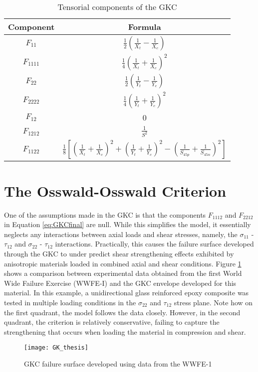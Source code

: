 \documentclass[main.tex]{subfiles}
\begin{document}
\begin{table} [h]
	\centering
	\caption{Tensorial components of the GKC}
	\begin{tabular}{ c c } 
	\toprule
		\textbf{Component} & \textbf{Formula} \\
		\midrule
		$F_{11}$ & $\frac{1}{2}(\frac{1}{X_t}-\frac{1}{X_c})$\\ [1ex]
		$F_{1111}$ & $\frac{1}{4}(\frac{1}{X_t}+\frac{1}{X_c})^2$\\ [1ex]
		$F_{22}$ & $\frac{1}{2}(\frac{1}{Y_t}-\frac{1}{Y_c})$\\ [1ex]
		$F_{2222}$ & $\frac{1}{4}(\frac{1}{Y_t}+\frac{1}{Y_c})^2$\\ [1ex]
		$F_{12}$ & 0\\ [1ex]
		$F_{1212}$ & $\frac{1}{S^2}$\\ [1ex]
		$F_{1122}$ & $\frac{1}{8}[(\frac{1}{X_t}+\frac{1}{X_c})^2+(\frac{1}{Y_t}+\frac{1}{Y_c})^2-(\frac{1}{S_{45p}}+\frac{1}{S_{45n}})^2]$\\ [1ex]
		\bottomrule
	\end{tabular}
	\label{tab:GKtens}
\end{table}
\pagebreak

\section{The Osswald-Osswald Criterion}\label{sec:OOC}
One of the assumptions made in the GKC is that the components $F_{1112}$ and $F_{2212}$ in Equation \ref{eq:GKCfinal} are null. While this simplifies the model, it essentially neglects any interactions between axial loads and shear stresses, namely, the $\sigma_{11}$ - $\tau_{12}$ and $\sigma_{22}$ - $\tau_{12}$ interactions. Practically, this causes the failure surface developed through the GKC to under predict shear strengthening effects exhibited by anisotropic materials loaded in combined axial and shear conditions. Figure \ref{fig:GKClimit} shows a comparison between experimental data obtained from the first World Wide Failure Exercise (WWFE-I) and the GKC envelope developed for this material. In this example, a unidirectional glass reinforced epoxy composite was tested in multiple loading conditions in the $\sigma_{22}$ and $\tau_{12}$ stress plane. Note how on the first quadrant, the model follows the data closely. However, in the second quadrant, the criterion is relatively conservative, failing to capture the strengthening that occurs when loading the material in compression and shear.   

\begin{figure}[h]
	\center
	\texttt{[image: GK\_thesis]}
	\caption{GKC failure surface developed using data from the WWFE-1 \cite{Osswald2017a}} \label{fig:GKClimit}
\end{figure}
\end{document}
